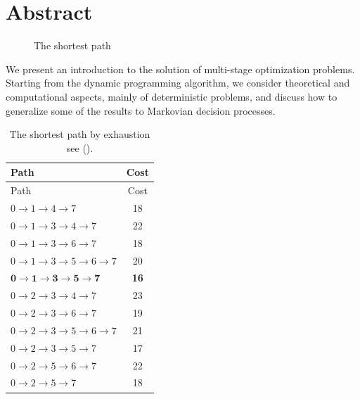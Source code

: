 \documentclass[
  letterpaper,
]{krantz}
\theoremstyle{plain}
\theoremstyle{definition}
\theoremstyle{definition}
\theoremstyle{remark}
\begin{document}
\chapter{Abstract}\label{abstract}

\begin{figure}


\caption{\label{fig-brandimarte_net}The shortest path}

\end{figure}%

We present an introduction to the solution of multi-stage optimization
problems. Starting from the dynamic programming algorithm, we consider
theoretical and computational aspects, mainly of deterministic problems,
and discuss how to generalize some of the results to Markovian decision
processes.

\begin{longtable}[]{@{}lc@{}}
\caption{The shortest path by exhaustion see
().}\label{tbl-brandimarte_paths}\tabularnewline
\toprule\noalign{}
Path & Cost \\
\midrule\noalign{}
\endfirsthead
\toprule\noalign{}
Path & Cost \\
\midrule\noalign{}
\endhead
\bottomrule\noalign{}
\endlastfoot
\(0 \to 1 \to 4 \to 7\) & 18 \\
\(0 \to 1 \to 3 \to 4 \to 7\) & 22 \\
\(0 \to 1 \to 3 \to 6 \to 7\) & 18 \\
\(0 \to 1 \to 3 \to 5 \to 6 \to 7\) & 20 \\
\(\mathbf{0 \to 1 \to 3 \to 5 \to 7}\) & \textbf{16} \\
\(0 \to 2 \to 3 \to 4 \to 7\) & 23 \\
\(0 \to 2 \to 3 \to 6 \to 7\) & 19 \\
\(0 \to 2 \to 3 \to 5 \to 6 \to 7\) & 21 \\
\(0 \to 2 \to 3 \to 5 \to 7\) & 17 \\
\(0 \to 2 \to 5 \to 6 \to 7\) & 22 \\
\(0 \to 2 \to 5 \to 7\) & 18 \\
\end{longtable}
\end{document}
